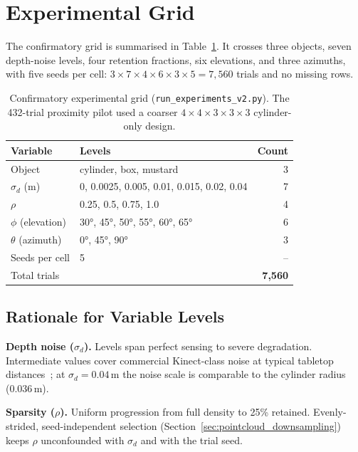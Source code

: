 \documentclass[11pt,a4paper]{report}
\begin{document}
\section{Experimental Grid}
\label{sec:grid}

The confirmatory grid is summarised in Table~\ref{tab:grid}. It crosses three objects, seven depth-noise levels, four retention fractions, six elevations, and three azimuths, with five seeds per cell: $3 \times 7 \times 4 \times 6 \times 3 \times 5 = 7{,}560$ trials and no missing rows.

\begin{table}[t]
  \caption{Confirmatory experimental grid (\texttt{run\_experiments\_v2.py}). The 432-trial proximity pilot used a coarser $4{\times}4{\times}3{\times}3{\times}3$ cylinder-only design.}
  \label{tab:grid}
  \centering
  \begin{tabular}{llr}
    \toprule
    \textbf{Variable} & \textbf{Levels} & \textbf{Count} \\
    \midrule
    Object              & cylinder, box, mustard & 3 \\
    $\sigma_d$ (m)      & 0, 0.0025, 0.005, 0.01, 0.015, 0.02, 0.04 & 7 \\
    $\rho$              & 0.25, 0.5, 0.75, 1.0 & 4 \\
    $\phi$ (elevation)  & 30°, 45°, 50°, 55°, 60°, 65° & 6 \\
    $\theta$ (azimuth)  & 0°, 45°, 90° & 3 \\
    \midrule
    Seeds per cell      & 5 & -- \\
    Total trials        & & \textbf{7{,}560} \\
    \bottomrule
  \end{tabular}
\end{table}

\subsection{Rationale for Variable Levels}

\textbf{Depth noise ($\sigma_d$).} Levels span perfect sensing to severe degradation. Intermediate values cover commercial Kinect-class noise at typical tabletop distances~\cite{khoshelham2011accuracy}; at $\sigma_d = 0.04$\,m the noise scale is comparable to the cylinder radius (0.036\,m).

\textbf{Sparsity ($\rho$).} Uniform progression from full density to 25\% retained. Evenly-strided, seed-independent selection (Section~\ref{sec:pointcloud_downsampling}) keeps $\rho$ unconfounded with $\sigma_d$ and with the trial seed.
\end{document}
